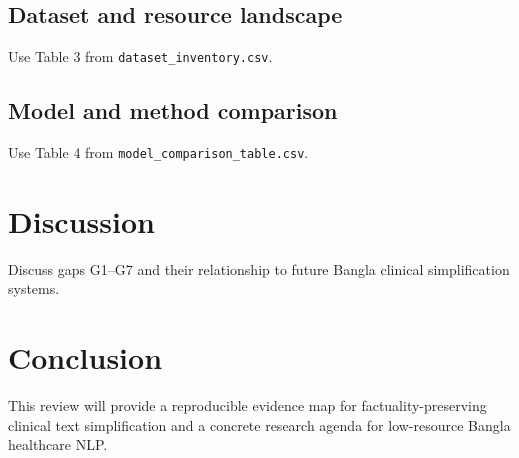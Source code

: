\documentclass[review]{elsarticle}
\begin{document}
\subsection{Dataset and resource landscape}
Use Table 3 from \texttt{dataset\_inventory.csv}.

\subsection{Model and method comparison}
Use Table 4 from \texttt{model\_comparison\_table.csv}.

\section{Discussion}
Discuss gaps G1--G7 and their relationship to future Bangla clinical simplification systems.

\section{Conclusion}
This review will provide a reproducible evidence map for factuality-preserving clinical text simplification and a concrete research agenda for low-resource Bangla healthcare NLP.



\end{document}

